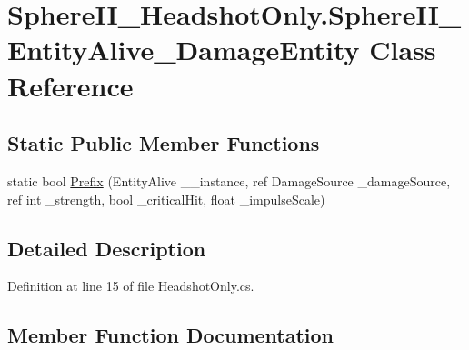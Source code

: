 \hypertarget{class_sphere_i_i___headshot_only_1_1_sphere_i_i___entity_alive___damage_entity}{}\section{Sphere\+I\+I\+\_\+\+Headshot\+Only.\+Sphere\+I\+I\+\_\+\+Entity\+Alive\+\_\+\+Damage\+Entity Class Reference}
\label{class_sphere_i_i___headshot_only_1_1_sphere_i_i___entity_alive___damage_entity}
\subsection*{Static Public Member Functions}
\begin{DoxyCompactItemize}
\item 
static bool \mbox{\hyperlink{class_sphere_i_i___headshot_only_1_1_sphere_i_i___entity_alive___damage_entity_aa966b5e4638f78b2c27f6115c201e53f}{Prefix}} (Entity\+Alive \+\_\+\+\_\+instance, ref Damage\+Source \+\_\+damage\+Source, ref int \+\_\+strength, bool \+\_\+critical\+Hit, float \+\_\+impulse\+Scale)
\end{DoxyCompactItemize}


\subsection{Detailed Description}


Definition at line 15 of file Headshot\+Only.\+cs.



\subsection{Member Function Documentation}
\mbox{\label{class_sphere_i_i___headshot_only_1_1_sphere_i_i___entity_alive___damage_entity_aa966b5e4638f78b2c27f6115c201e53f}} 
